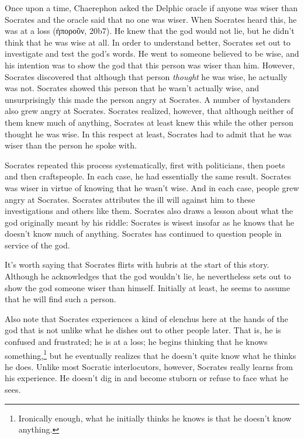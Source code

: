 \documentclass[11pt]{article}
\begin{document}
Once upon a time, Chaerephon asked the Delphic oracle if anyone was wiser than Socrates and the oracle said that no one was wiser.  When Socrates heard this, he was at a loss ({\g ἠποροῦν}, 20b7).  He knew that the god would not lie, but he didn't think that he was wise at all.  In order to understand better, Socrates set out to investigate and test the god's words.  He went to someone believed to be wise, and his intention was to show the god that this person was wiser than him.  However, Socrates discovered that although that person \emph{thought} he was wise, he actually was not.  Socrates showed this person that he wasn't actually wise, and unsurprisingly this made the person angry at Socrates.  A number of bystanders also grew angry at Socrates.  Socrates realized, however, that although neither of them knew much of anything, Socrates at least knew this while the other person thought he was wise. In this respect at least, Socrates had to admit that he was wiser than the person he spoke with.

Socrates repeated this process systematically, first with politicians, then poets and then craftspeople.  In each case, he had essentially the same result.  Socrates was wiser in virtue of knowing that he wasn't wise.  And in each case, people grew angry at Socrates.  Socrates attributes the ill will against him to these investigations and others like them.  Socrates also draws a lesson about what the god originally meant by his riddle: Socrates is wisest insofar as he knows that he doesn't know much of anything.  Socrates has continued to question people in service of the god.

It's worth saying that Socrates flirts with hubris at the start of this story.  Although he acknowledges that the god wouldn't lie, he nevertheless sets out to show the god someone wiser than himself.  Initially at least, he seems to assume that he will find such a person.

Also note that Socrates experiences a kind of elenchus here at the hands of the god that is not unlike what he dishes out to other people later. That is, he is confused and frustrated; he is at a loss; he begins thinking that he knows something,\footnote{Ironically enough, what he initially thinks he knows is that he doesn't know anything.} but he eventually realizes that he doesn't quite know what he thinks he does.  Unlike most Socratic interlocutors, however, Socrates really learns from his experience.  He doesn't dig in and become stuborn or refuse to face what he sees.
\end{document}
